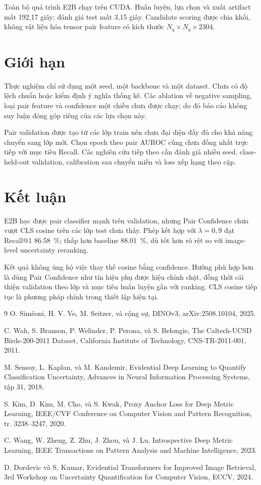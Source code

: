 \documentclass[11pt,a4paper]{article}
\begin{document}
Toàn bộ quá trình E2B chạy trên CUDA. Huấn luyện, lựa chọn và xuất artifact mất 192,17 giây; đánh giá test mất 3,15 giây. Candidate scoring được chia khối, không vật liệu hóa tensor pair feature có kích thước $N_q\times N_g\times2304$.

\section{Giới hạn}
Thực nghiệm chỉ sử dụng một seed, một backbone và một dataset. Chưa có độ lệch chuẩn hoặc kiểm định ý nghĩa thống kê. Các ablation về negative sampling, loại pair feature và confidence một chiều chưa được chạy; do đó báo cáo không suy luận đóng góp riêng của các lựa chọn này.

Pair validation được tạo từ các lớp train nên chưa đại diện đầy đủ cho khả năng chuyển sang lớp mới. Chọn epoch theo pair AUROC cũng chưa đồng nhất trực tiếp với mục tiêu Recall. Các nghiên cứu tiếp theo cần đánh giá nhiều seed, class-held-out validation, calibration sau chuyển miền và loss xếp hạng theo cặp.

\section{Kết luận}
E2B học được pair classifier mạnh trên validation, nhưng Pair Confidence chưa vượt CLS cosine trên các lớp test chưa thấy. Phép kết hợp với $\lambda=0,9$ đạt Recall@1 \SI{86.58}{\percent}; thấp hơn baseline \SI{88.01}{\percent}, dù tốt hơn rõ rệt so với image-level uncertainty reranking.

Kết quả không ủng hộ việc thay thế cosine bằng confidence. Hướng phù hợp hơn là dùng Pair Confidence như tín hiệu phụ được hiệu chỉnh chặt, đồng thời cải thiện validation theo lớp và mục tiêu huấn luyện gần với ranking. CLS cosine tiếp tục là phương pháp chính trong thiết lập hiện tại.

\begin{thebibliography}{9}
O. Siméoni, H. V. Vo, M. Seitzer, và cộng sự,
DINOv3, arXiv:2508.10104, 2025.

C. Wah, S. Branson, P. Welinder, P. Perona, và S. Belongie,
The Caltech-UCSD Birds-200-2011 Dataset,
California Institute of Technology, CNS-TR-2011-001, 2011.

M. Sensoy, L. Kaplan, và M. Kandemir,
Evidential Deep Learning to Quantify Classification Uncertainty,
Advances in Neural Information Processing Systems, tập 31, 2018.

S. Kim, D. Kim, M. Cho, và S. Kwak,
Proxy Anchor Loss for Deep Metric Learning,
IEEE/CVF Conference on Computer Vision and Pattern Recognition,
tr. 3238--3247, 2020.

C. Wang, W. Zheng, Z. Zhu, J. Zhou, và J. Lu,
Introspective Deep Metric Learning,
IEEE Transactions on Pattern Analysis and Machine Intelligence, 2023.

D. Dordevic và S. Kumar,
Evidential Transformers for Improved Image Retrieval,
3rd Workshop on Uncertainty Quantification for Computer Vision, ECCV, 2024.
\end{thebibliography}
\end{document}
